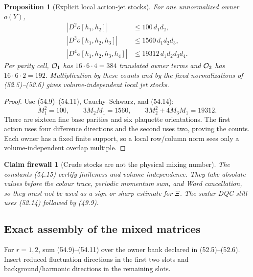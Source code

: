 \documentclass[11pt,oneside]{book}
\newtheorem{proposition}[theorem]{Proposition}
\newtheorem{firewall}[theorem]{Claim firewall}
\theoremstyle{definition}
\theoremstyle{remark}
\begin{document}
\begin{proposition}[Explicit local action-jet stocks]
\label{prop:e8v54-action-stocks}
For one unnormalized owner \(o(Y)\),
\[
\begin{aligned}
 |D^2o[h_1,h_2]|
 &\le100\,d_1d_2,\\
 |D^3o[h_1,h_2,h_3]|
 &\le1560\,d_1d_2d_3,\\
 |D^4o[h_1,h_2,h_3,h_4]|
 &\le19312\,d_1d_2d_3d_4.                                  \tag{54.15}
\end{aligned}
\]
Per parity cell, \({\cal O}_1\) has \(16\cdot6\cdot4=384\)
translated owner terms and \({\cal O}_2\) has
\(16\cdot6\cdot2=192\).  Multiplication by these counts and by the
fixed normalizations of (52.5)--(52.6) gives volume-independent
local jet stocks.
\end{proposition}

\begin{proof}
Use (54.9)--(54.11), Cauchy--Schwarz, and (54.14):
\[
 M_1^2=100,\qquad
 3M_2M_1=1560,\qquad
 3M_2^2+4M_3M_1=19312.
\]
There are sixteen fine base parities and six plaquette
orientations.  The first action uses four difference directions
and the second uses two, proving the counts.  Each owner has a
fixed finite support, so a local row/column norm sees only a
volume-independent overlap multiple.
\end{proof}

\begin{firewall}[Crude stocks are not the physical mixing number]
\label{fire:e8v54-crude-stocks}
The constants (54.15) certify finiteness and volume independence.
They take absolute values before the colour trace, periodic
momentum sum, and Ward cancellation, so they must not be used as a
sign or sharp estimate for \(\Xi\).  The scalar DQC still uses
(52.14) followed by (49.9).
\end{firewall}

\subsection{Exact assembly of the mixed matrices}

For \(r=1,2\), sum (54.9)--(54.11) over the owner bank declared in
(52.5)--(52.6).  Insert reduced fluctuation directions in the first
two slots and background/harmonic directions in the remaining
slots.
\end{document}
